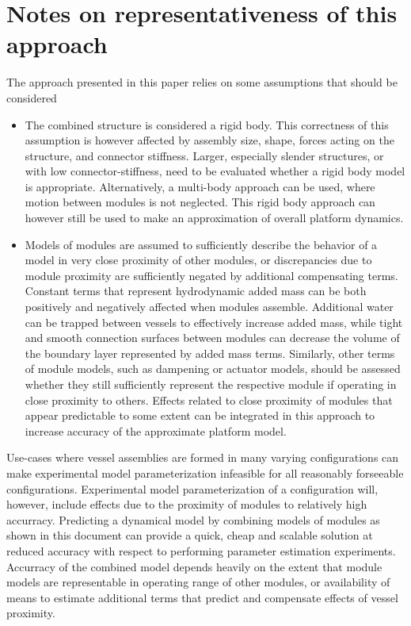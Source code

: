 \section{Notes on representativeness of this approach}
The approach presented in this paper relies on some assumptions that should be considered
\begin{itemize}
	\item The combined structure is considered a rigid body. This correctness of this assumption is however affected by assembly size, shape, forces acting on the structure, and connector stiffness. Larger, especially slender structures, or with low connector-stiffness, need to be evaluated whether a rigid body model is appropriate. Alternatively, a multi-body approach can be used, where motion between modules is not neglected. This rigid body approach can however still be used to make an approximation of overall platform dynamics. 
	\item Models of modules are assumed to sufficiently describe the behavior of a model in very close proximity of other modules, or discrepancies due to module proximity are sufficiently negated by additional compensating terms. Constant terms that represent hydrodynamic added mass can be both positively and negatively affected when modules assemble. Additional water can be trapped between vessels to effectively increase added mass, while tight and smooth connection surfaces between modules can decrease the volume of the boundary layer represented by added mass terms. Similarly, other terms of module models, such as dampening or actuator models, should be assessed whether they still sufficiently represent the respective module if operating in close proximity to others. Effects related to close proximity of modules that appear predictable to some extent can be integrated in this approach to increase accuracy of the approximate platform model. 
\end{itemize}

Use-cases where vessel assemblies are formed in many varying configurations can make experimental model parameterization infeasible for all reasonably forseeable configurations. Experimental model parameterization of a configuration will, however, include effects due to the proximity of modules to relatively high accurracy. Predicting a dynamical model by combining models of modules as shown in this document can provide a quick, cheap and scalable solution at reduced accuracy with respect to performing parameter estimation experiments. Accurracy of the combined model depends heavily on the extent that module models are representable in operating range of other modules, or availability of means to estimate additional terms that predict and compensate effects of vessel proximity. 